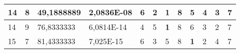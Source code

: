 \documentclass[conference]{IEEEtran}
\begin{document}
\begin{table*}[]
\begin{tabular}{|llll|llllllll|}
\multicolumn{1}{|l|}{14}                                                    & \multicolumn{1}{l|}{8}                                                        & \multicolumn{1}{l|}{49,1888889}                                                   & 2,0836E-08                     & \multicolumn{1}{l|}{6}                                                  & \multicolumn{1}{l|}{2}                                                  & \multicolumn{1}{l|}{\textbf{1}}                                         & \multicolumn{1}{l|}{8}                                                  & \multicolumn{1}{l|}{5}                                                  & \multicolumn{1}{l|}{4}                                                  & \multicolumn{1}{l|}{3}                                                  & 7                          \\ \hline
\multicolumn{1}{|l|}{14}                                                    & \multicolumn{1}{l|}{9}                                                        & \multicolumn{1}{l|}{76,8333333}                                                   & 6,0814E-14                     & \multicolumn{1}{l|}{4}                                                  & \multicolumn{1}{l|}{5}                                                  & \multicolumn{1}{l|}{\textbf{1}}                                         & \multicolumn{1}{l|}{8}                                                  & \multicolumn{1}{l|}{6}                                                  & \multicolumn{1}{l|}{3}                                                  & \multicolumn{1}{l|}{2}                                                  & 7                          \\ \hline
\multicolumn{1}{|l|}{15}                                                    & \multicolumn{1}{l|}{7}                                                        & \multicolumn{1}{l|}{81,4333333}                                                   & 7,025E-15                      & \multicolumn{1}{l|}{6}                                                  & \multicolumn{1}{l|}{3}                                                  & \multicolumn{1}{l|}{5}                                                  & \multicolumn{1}{l|}{8}                                                  & \multicolumn{1}{l|}{\textbf{1}}                                         & \multicolumn{1}{l|}{2}                                                  & \multicolumn{1}{l|}{4}                                                  & 7                          \\ \hline

\end{tabular}
\end{table*}
\end{document}
